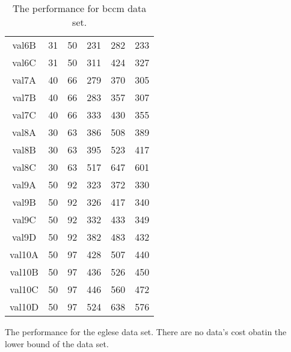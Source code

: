 \documentclass[conference,compsoc]{IEEEtran}
\begin{document}
\begin{appendix}
\begin{table}[htbp]
\begin{center}
\begin{tabular}{@{}cccccc@{}}
val6B          & 31          & 50          & 231          & 282          & 233          \\
val6C          & 31          & 50          & 311          & 424          & 327          \\
val7A          & 40          & 66          & 279          & 370          & 305          \\
val7B          & 40          & 66          & 283          & 357          & 307          \\
val7C          & 40          & 66          & 333          & 430          & 355          \\
val8A          & 30          & 63          & 386          & 508          & 389          \\
val8B          & 30          & 63          & 395          & 523          & 417          \\
val8C          & 30          & 63          & 517          & 647          & 601          \\
val9A          & 50          & 92          & 323          & 372          & 330          \\
val9B          & 50          & 92          & 326          & 417          & 340          \\
val9C          & 50          & 92          & 332          & 433          & 349          \\
val9D          & 50          & 92          & 382          & 483          & 432          \\
val10A         & 50          & 97          & 428          & 507          & 440          \\
val10B         & 50          & 97          & 436          & 526          & 450          \\
val10C         & 50          & 97          & 446          & 560          & 472          \\
val10D         & 50          & 97          & 524          & 638          & 576          \\ \bottomrule
\end{tabular}
\caption{The performance for bccm data set.}
\end{center}
\end{table}

The performance for the eglese data set. There are no data's cost obatin the lower bound of the data set.


\end{appendix}
\end{document}
